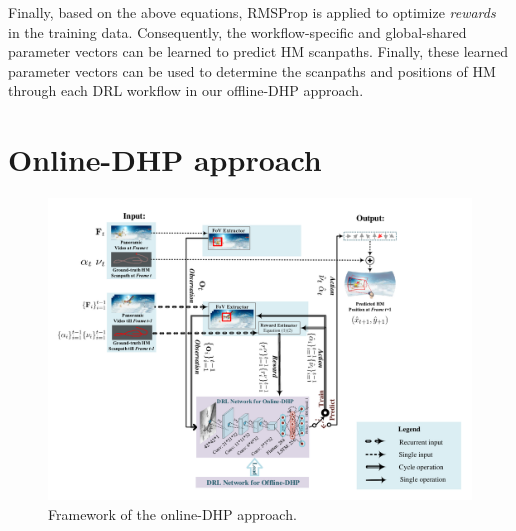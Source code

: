 \documentclass[10pt,journal,compsoc]{IEEEtran}
\begin{document}
Finally, based on the above equations, RMSProp \cite{tieleman2012lecture} is applied to optimize \textit{rewards} in the training data. Consequently, the workflow-specific and global-shared parameter vectors can be learned to predict HM scanpaths.
Finally, these learned parameter vectors can be used to determine the scanpaths and positions of HM through each DRL workflow in our offline-DHP approach.

\section{Online-DHP approach}

\begin{figure}
\vspace{-2em}
	\begin{center}
		\centerline{\includegraphics[width=\columnwidth]{figures/dhp_approach_on_line/whole_framework_online_5}}%
       \vspace{-1em}
		\caption{\footnotesize{Framework of the online-DHP approach.}}
		\label{online-framework}
	\end{center}
\vspace{-2em}
\end{figure}
\end{document}
